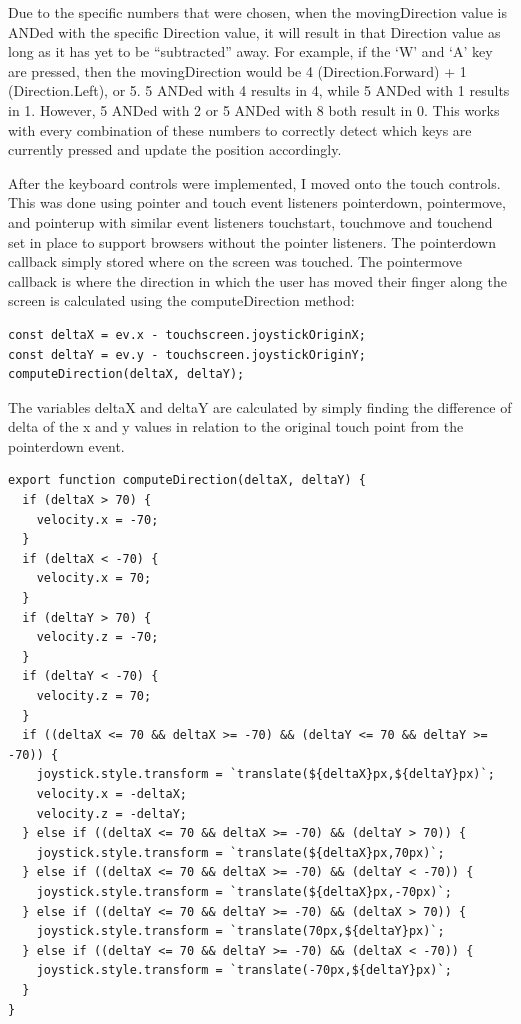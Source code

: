 \documentclass[onecolumn, draftclsnofoot,10pt, compsoc]{IEEEtran}
\begin{document}
Due to the specific numbers that were chosen, when the movingDirection value is ANDed with the specific Direction value, it will result in that Direction value as long as it has yet to be “subtracted” away. For example, if the ‘W’ and ‘A’ key are pressed, then the movingDirection would be 4 (Direction.Forward) + 1 (Direction.Left), or 5.  5 ANDed with 4 results in 4, while 5 ANDed with 1 results in 1. However, 5 ANDed with 2 or 5 ANDed with 8 both result in 0. This works with every combination of these numbers to correctly detect which keys are currently pressed and update the position accordingly.

After the keyboard controls were implemented, I moved onto the touch controls. This was done using pointer and touch event listeners pointerdown, pointermove, and pointerup with similar event listeners touchstart, touchmove and touchend set in place to support browsers without the pointer listeners. The pointerdown callback simply stored where on the screen was touched. The pointermove callback is where the direction in which the user has moved their finger along the screen is calculated using the computeDirection method:

\begin{lstlisting}
const deltaX = ev.x - touchscreen.joystickOriginX;
const deltaY = ev.y - touchscreen.joystickOriginY;
computeDirection(deltaX, deltaY);
\end{lstlisting}

The variables deltaX and deltaY are calculated by simply finding the difference of delta of the x and y values in relation to the original touch point from the pointerdown event.

\begin{lstlisting}
export function computeDirection(deltaX, deltaY) {
  if (deltaX > 70) {
    velocity.x = -70;
  }
  if (deltaX < -70) {
    velocity.x = 70;
  }
  if (deltaY > 70) {
    velocity.z = -70;
  }
  if (deltaY < -70) {
    velocity.z = 70;
  }
  if ((deltaX <= 70 && deltaX >= -70) && (deltaY <= 70 && deltaY >= -70)) {
    joystick.style.transform = `translate(${deltaX}px,${deltaY}px)`;
    velocity.x = -deltaX;
    velocity.z = -deltaY;
  } else if ((deltaX <= 70 && deltaX >= -70) && (deltaY > 70)) {
    joystick.style.transform = `translate(${deltaX}px,70px)`;
  } else if ((deltaX <= 70 && deltaX >= -70) && (deltaY < -70)) {
    joystick.style.transform = `translate(${deltaX}px,-70px)`;
  } else if ((deltaY <= 70 && deltaY >= -70) && (deltaX > 70)) {
    joystick.style.transform = `translate(70px,${deltaY}px)`;
  } else if ((deltaY <= 70 && deltaY >= -70) && (deltaX < -70)) {
    joystick.style.transform = `translate(-70px,${deltaY}px)`;
  }
}
\end{lstlisting}
\end{document}
